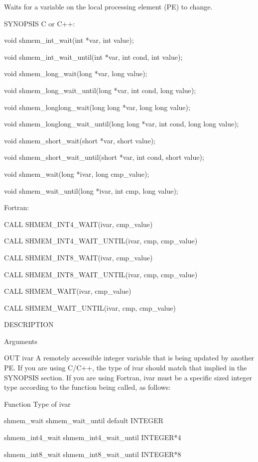        Waits	for  a	variable  on the local processing element (PE) to change.

SYNOPSIS
       C or C++:

	  void shmem_int_wait(int *var, int value);

	  void shmem_int_wait_until(int *var, int cond, int value);

	  void shmem_long_wait(long *var, long value);

	  void shmem_long_wait_until(long *var, int cond, long value);

	  void shmem_longlong_wait(long long *var, long long value);

	  void shmem_longlong_wait_until(long long *var, int cond,  long  long
	  value);

	  void shmem_short_wait(short *var, short value);

	  void shmem_short_wait_until(short *var, int cond, short value);

	  void shmem_wait(long *ivar, long cmp_value);

	  void shmem_wait_until(long *ivar, int cmp, long value);

       Fortran:

	  CALL SHMEM_INT4_WAIT(ivar, cmp_value)

	  CALL SHMEM_INT4_WAIT_UNTIL(ivar, cmp, cmp_value)

	  CALL SHMEM_INT8_WAIT(ivar, cmp_value)

	  CALL SHMEM_INT8_WAIT_UNTIL(ivar, cmp, cmp_value)

	  CALL SHMEM_WAIT(ivar, cmp_value)

	  CALL SHMEM_WAIT_UNTIL(ivar, cmp, cmp_value)

DESCRIPTION

Arguments

	OUT       ivar    A remotely accessible integer variable that is being updated by
	       another PE.  If you are using C/C++, the type  of  ivar	should
	       match  that  implied in the SYNOPSIS section.  If you are using
	       Fortran, ivar must be a specific sized integer  type  according
	       to the function being called, as follows:

	       Function			Type of ivar

	       shmem_wait
	       shmem_wait_until		default INTEGER

	       shmem_int4_wait
	       shmem_int4_wait_until	INTEGER*4

	       shmem_int8_wait
	       shmem_int8_wait_until	INTEGER*8

